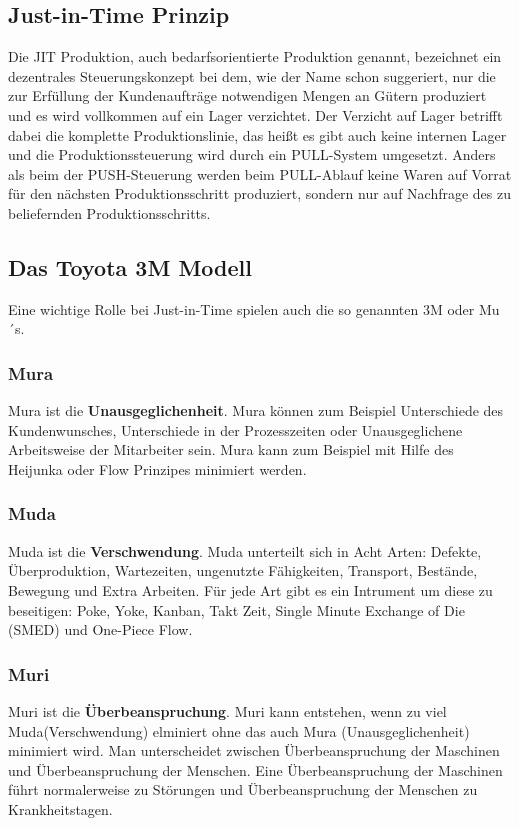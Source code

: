 \documentclass[00_ToyotaProduktionssystem.tex]{subfiles}
\begin{document}
\subsection{Just-in-Time Prinzip}
Die JIT Produktion, auch bedarfsorientierte Produktion genannt, bezeichnet ein dezentrales Steuerungskonzept bei dem,  wie der Name schon suggeriert, nur die zur Erfüllung der Kundenaufträge notwendigen Mengen an Gütern produziert und es wird vollkommen auf ein Lager verzichtet. Der Verzicht auf Lager betrifft dabei die komplette Produktionslinie, das heißt es gibt auch keine internen Lager und die Produktionssteuerung wird durch ein PULL-System umgesetzt. Anders als beim der PUSH-Steuerung werden beim PULL-Ablauf keine Waren auf Vorrat für den nächsten Produktionsschritt produziert, sondern nur auf Nachfrage des zu beliefernden Produktionsschritts.
\subsection{Das Toyota 3M Modell}
Eine wichtige Rolle bei Just-in-Time spielen auch die so genannten 3M oder Mu´s.
\subsubsection{Mura}
Mura ist die \textbf{Unausgeglichenheit}. Mura können zum Beispiel Unterschiede des Kundenwunsches, Unterschiede in der Prozesszeiten oder Unausgeglichene Arbeitsweise der Mitarbeiter sein. Mura kann zum Beispiel mit Hilfe des Heijunka oder Flow Prinzipes minimiert werden.
\subsubsection{Muda}
Muda ist die \textbf{Verschwendung}. Muda unterteilt sich in Acht Arten: Defekte, Überproduktion, Wartezeiten, ungenutzte Fähigkeiten, Transport, Bestände, Bewegung und Extra Arbeiten. Für jede Art gibt es ein Intrument um diese zu beseitigen: Poke, Yoke, Kanban, Takt Zeit, Single Minute Exchange of Die (SMED) und One-Piece Flow.
\subsubsection{Muri}
Muri ist die \textbf{Überbeanspruchung}. Muri kann entstehen, wenn zu viel Muda(Verschwendung) elminiert ohne das auch Mura (Unausgeglichenheit) minimiert wird. Man unterscheidet zwischen Überbeanspruchung der Maschinen und Überbeanspruchung der Menschen. Eine Überbeanspruchung der Maschinen führt normalerweise zu Störungen und Überbeanspruchung der Menschen zu Krankheitstagen. 
\end{document}
